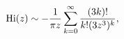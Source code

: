 \[\mathop{\mathrm{Hi}\/}\nolimits\!\left(z\right)\sim-\frac{1}{\pi z}\sum_{k=0}^%
{\infty}\frac{(3k)!}{k!(3z^{3})^{k}},\]